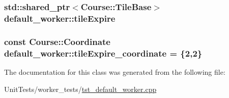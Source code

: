 \hypertarget{classdefault__worker_ae85c6a01155685fe642e8e6c55116da2}{
\subsubsection[{tile\-Expire}]{\setlength{\rightskip}{0pt plus 5cm}std\-::shared\-\_\-ptr$<${\bf Course\-::\-Tile\-Base}$>$ default\-\_\-worker\-::tile\-Expire\hspace{0.3cm}{\ttfamily [private]}}}\label{classdefault__worker_ae85c6a01155685fe642e8e6c55116da2}
\hypertarget{classdefault__worker_a0a0fe24881186dbb4704e66f121dfeb2}{
\subsubsection[{tile\-Expire\-\_\-coordinate}]{\setlength{\rightskip}{0pt plus 5cm}const {\bf Course\-::\-Coordinate} default\-\_\-worker\-::tile\-Expire\-\_\-coordinate = \{2,2\}\hspace{0.3cm}{\ttfamily [private]}}}\label{classdefault__worker_a0a0fe24881186dbb4704e66f121dfeb2}


The documentation for this class was generated from the following file\-:\begin{DoxyCompactItemize}
\item 
Unit\-Tests/worker\-\_\-tests/\hyperlink{tst__default__worker_8cpp}{tst\-\_\-default\-\_\-worker.\-cpp}\end{DoxyCompactItemize}
